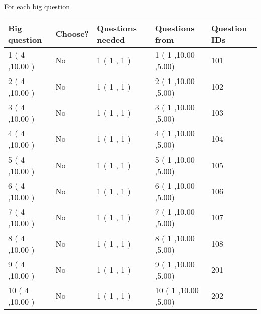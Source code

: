 \documentclass{ctexart}
\begin{document}
   
 \newpage
   
{\LARGE{For each big question}}
   
   
\vspace{0.2in}
   
   
\noindent\hspace{-0.4in}\begin{tabular}{|l|l|l|l|l|}
\hline
 Big question & Choose? & Questions needed & Questions from & Question IDs \\ 
\hline
 1 ( 4 ,10.00
 ) &  No   & 
 1 ( 1 ,  1 ) &  1 ( 1
,10.00
 ,5.00) &  101  \\
 \hline
 2 ( 4 ,10.00
 ) &  No   & 
 1 ( 1 ,  1 ) &  2 ( 1
,10.00
 ,5.00) &  102  \\
 \hline
 3 ( 4 ,10.00
 ) &  No   & 
 1 ( 1 ,  1 ) &  3 ( 1
,10.00
 ,5.00) &  103  \\
 \hline
 4 ( 4 ,10.00
 ) &  No   & 
 1 ( 1 ,  1 ) &  4 ( 1
,10.00
 ,5.00) &  104  \\
 \hline
 5 ( 4 ,10.00
 ) &  No   & 
 1 ( 1 ,  1 ) &  5 ( 1
,10.00
 ,5.00) &  105  \\
 \hline
 6 ( 4 ,10.00
 ) &  No   & 
 1 ( 1 ,  1 ) &  6 ( 1
,10.00
 ,5.00) &  106  \\
 \hline
 7 ( 4 ,10.00
 ) &  No   & 
 1 ( 1 ,  1 ) &  7 ( 1
,10.00
 ,5.00) &  107  \\
 \hline
 8 ( 4 ,10.00
 ) &  No   & 
 1 ( 1 ,  1 ) &  8 ( 1
,10.00
 ,5.00) &  108  \\
 \hline
 9 ( 4 ,10.00
 ) &  No   & 
 1 ( 1 ,  1 ) &  9 ( 1
,10.00
 ,5.00) &  201  \\
 \hline
 10 ( 4 ,10.00
 ) &  No   & 
 1 ( 1 ,  1 ) &  10 ( 1
,10.00
 ,5.00) &  202  \\
 \hline
 \end{tabular}
 
 
\end{document}
